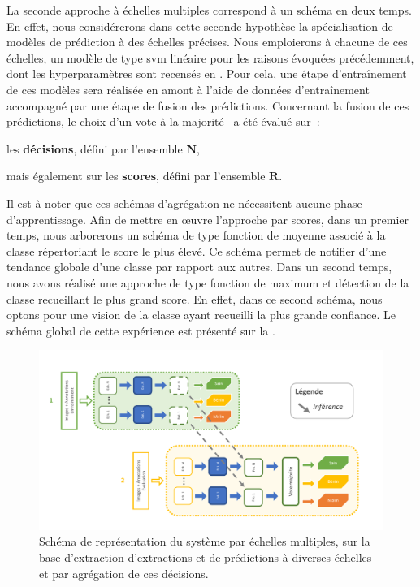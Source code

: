 La seconde approche à échelles multiples correspond à un schéma en deux temps. En effet, nous considérerons dans cette seconde hypothèse la spécialisation de modèles de prédiction à des échelles précises. Nous emploierons à chacune de ces échelles, un modèle de type \gls{svm} linéaire pour les raisons évoquées précédemment, dont les hyperparamètres sont recensés en . Pour cela, une étape d'entraînement de ces modèles sera réalisée en amont à l'aide de données d'entraînement accompagné par une étape de fusion des prédictions. Concernant la fusion de ces prédictions, le choix d'un vote à la majorité~\cite{Kam1994,Lam1997} a été évalué sur~: 
\begin{inlinerate}
    \item les \textbf{décisions}, défini par l'ensemble $\mathbf{N}$,
    \item mais également sur les \textbf{scores}, défini par l'ensemble $\mathbf{R}$.
\end{inlinerate}
Il est à noter que ces schémas d'agrégation ne nécessitent aucune phase d'apprentissage. Afin de mettre en œuvre l'approche par scores, dans un premier temps, nous arborerons un schéma de type fonction de moyenne associé à la classe répertoriant le score le plus élevé. Ce schéma permet de notifier d'une tendance globale d'une classe par rapport aux autres. Dans un second temps, nous avons réalisé une approche de type fonction de maximum et détection de la classe recueillant le plus grand score. En effet, dans ce second schéma, nous optons pour une vision de la classe ayant recueilli la plus grande confiance. Le schéma global de cette expérience est présenté sur la .\par

\begin{figure}[H]
    \centering
    \includegraphics[width=\linewidth]{contents/chapter_5/resources/scheme_image_improvement_multiscale_decision.pdf}
    \caption{Schéma de représentation du système par échelles multiples, sur la base d'extraction d'extractions et de prédictions à diverses échelles et par agrégation de ces décisions.}
    \label{fig:scheme_image_improvement_multiscale_decision}
\end{figure}\par

